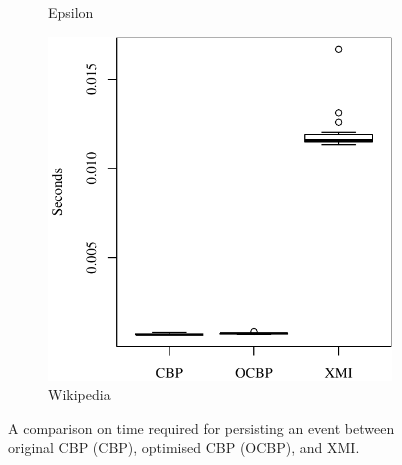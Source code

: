 \documentclass{beamer}
\begin{document}
\begin{frame}[fragile]
\begin{figure}[t]
\begin{subfigure}{0.325\textwidth}
        \caption{Epsilon}
        \label{fig:save_time_epsilon}
    \end{subfigure}
    \hfill
    \begin{subfigure}{0.325\textwidth}
        \centering
        \includegraphics[width=\linewidth]{save_time_wikipedia}
        \caption{Wikipedia}
        \label{fig:save_time_wikipedia}
    \end{subfigure}
    \caption{A comparison on time required for persisting an event between original CBP (CBP), optimised CBP (OCBP), and XMI.}
    \label{fig:savetime}
\end{figure}
\end{frame}
\end{document}

